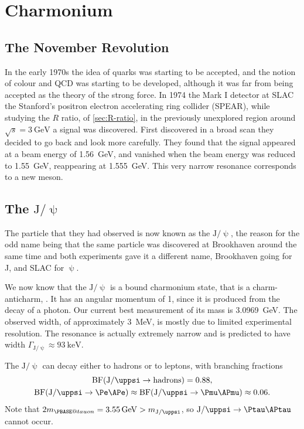 \documentclass[fleqn]{NotesClass}
\makeatletter
\newcommand{\Ptauneutral}{\ensuremath{\PBASE@tauon}}
\newcommand{\PJpsi}{\ensuremath{\mathrm{J}/\uppsi}}
\newcommand*{\branchingfraction}{\mathrm{BF}}
\makeatother
\begin{document}
    \section{Charmonium}
    \subsection{The November Revolution}
    In the early 1970s the idea of quarks was starting to be accepted, and the notion of colour and QCD was starting to be developed, although it was far from being accepted as the theory of the strong force.
    In 1974 the Mark I detector at SLAC the Stanford's positron electron accelerating ring collider (SPEAR), while studying the \(R\) ratio, of \cref{sec:R-ratio}, in the previously unexplored region around \(\sqrt{s} = \qty{3}{\giga\electronvolt}\) a signal was discovered.
    First discovered in a broad scan they decided to go back and look more carefully.
    They found that the signal appeared at a beam energy of \qty{1.56}{\giga\electronvolt}, and vanished when the beam energy was reduced to \qty{1.55}{\giga\electronvolt}, reappearing at \qty{1.555}{\giga\electronvolt}.
    This very narrow resonance corresponds to a new meson.
    
    \subsection{The \texorpdfstring{\PJpsi}{J/psi}}
    The particle that they had observed is now known as the \PJpsi, the reason for the odd name being that the same particle was discovered at Brookhaven around the same time and both experiments gave it a different name, Brookhaven going for J, and SLAC for \(\uppsi\).
    
    We now know that the \PJpsi{} is a bound charmonium state, that is a charm-anticharm, \Pc\APc.
    It has an angular momentum of 1, since it is produced from the decay of a photon.
    Our current best measurement of its mass is \qty{3.0969}{\giga\electronvolt}.
    The observed width, of approximately \qty{3}{\mega\electronvolt}, is mostly due to limited experimental resolution.
    The resonance is actually extremely narrow and is predicted to have width \(\Gamma_{\PJpsi} \approx \qty{93}{\kilo\electronvolt}\).
    
    The \PJpsi{} can decay either to hadrons or to leptons, with branching fractions
    \begin{gather}
        \branchingfraction(\PJpsi \to \text{hadrons}) = 0.88,\\ \branchingfraction(\PJpsi \to \Pe\APe) \approx \branchingfraction(\PJpsi \to \Pmu\APmu) \approx 0.06.
    \end{gather}
    Note that \(2m_{\Ptauneutral} = \qty{3.55}{\giga\electronvolt} > m_{\PJpsi}\), so \(\PJpsi \to \Ptau\APtau\) cannot occur.
    
\end{document}
